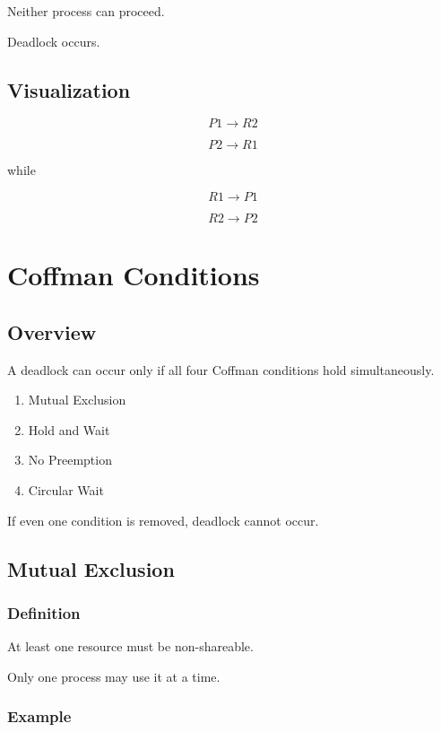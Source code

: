 Neither process can proceed.

Deadlock occurs.

\subsection{Visualization}

\[
P1 \rightarrow R2
\]

\[
P2 \rightarrow R1
\]

while

\[
R1 \rightarrow P1
\]

\[
R2 \rightarrow P2
\]

\section{Coffman Conditions}

\subsection{Overview}

A deadlock can occur only if all four Coffman conditions hold simultaneously.

\begin{enumerate}
\item Mutual Exclusion
\item Hold and Wait
\item No Preemption
\item Circular Wait
\end{enumerate}

If even one condition is removed, deadlock cannot occur.

\subsection{Mutual Exclusion}

\subsubsection{Definition}

At least one resource must be non-shareable.

Only one process may use it at a time.

\subsubsection{Example}

